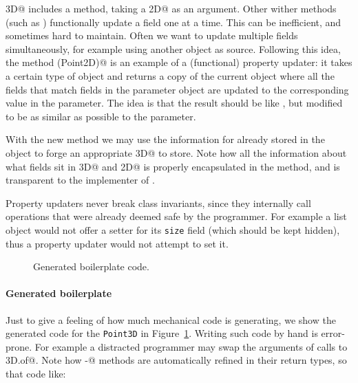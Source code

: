 \noindent \Q@Point3D@ includes a
\Q@with@ method, taking a \Q@Point2D@ as an argument.
Other wither methods (such as \Q@withX@) functionally update a field one at a time.  This can be
inefficient, and sometimes hard to maintain.  Often we want to update multiple
fields simultaneously, for example using another object as source.  Following
this idea, the method \Q@with(Point2D)@ is an example of a (functional)
property updater: it takes a certain type of object and returns a copy of the
current object where all the fields that match fields in the parameter
object are updated to the corresponding value in the parameter. The idea is that
the result should be like \Q@this@, but modified to be as similar as possible to the parameter.

With the new \Q@with@ method we may use the information for
\Q@z@ already stored in the object to forge an appropriate \Q@Point3D@
to store. Note how all the information about what fields sit in
\Q@Point3D@ and \Q@Point2D@ is properly encapsulated in the
\Q@with@ method, and is transparent to the implementer of \Q@Bird@.

Property updaters never break class invariants, since they
internally call operations that were already deemed
safe by the programmer. For example a list object
would not offer a setter for its \texttt{size} field (which should be kept hidden), thus
a property updater would not attempt to set it.



\begin{figure}
\saveSpaceFig
\caption{Generated boilerplate code.}
\label{fig:boilerplate}
\saveSpaceFig
\end{figure}

\paragraph{Generated boilerplate}
Just to give a feeling of how much mechanical code \mixin is generating, we show the
generated code for the \texttt{Point3D} in Figure~\ref{fig:boilerplate}.
Writing such code by hand is error-prone. For
example a distracted programmer may swap the arguments of calls to
\Q@Point3D.of@.  Note how \Q@with-@ methods are automatically refined in their
return types, so that code like:

